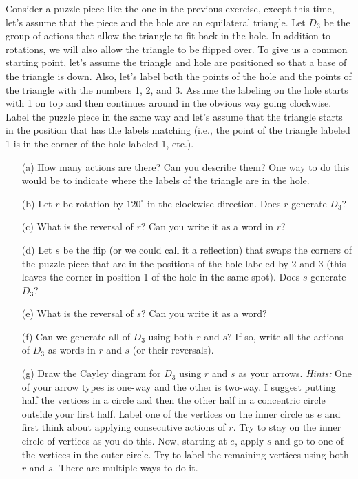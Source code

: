 \begin{exercise}\label{exer:introducing_D3}
Consider a puzzle piece like the one in the previous exercise, except this time, let's assume that the piece and the hole are an equilateral triangle.  Let $D_3$ be the group of actions that allow the triangle to fit back in the hole.  In addition to rotations, we will also allow the triangle to be flipped over.  To give us a common starting point, let's assume the triangle and hole are positioned so that a base of the triangle is down.  Also, let's label both the points of the hole and the points of the triangle with the numbers 1, 2, and 3.  Assume the labeling on the hole starts with 1 on top and then continues around in the obvious way going clockwise.  Label the puzzle piece in the same way and let's assume that the triangle starts in the position that has the labels matching (i.e., the point of the triangle labeled 1 is in the corner of the hole labeled 1, etc.).
\begin{enumerate}
\item[(a)] How many actions are there?  Can you describe them?  One way to do this would be to indicate where the labels of the triangle are in the hole.
\item[(b)] Let $r$ be rotation by $120^\circ$ in the clockwise direction.  Does $r$ generate $D_3$?
\item[(c)] What is the reversal of $r$?  Can you write it as a word in $r$?
\item[(d)] Let $s$ be the flip (or we could call it a reflection) that swaps the corners of the puzzle piece that are in the positions of the hole labeled by 2 and 3 (this leaves the corner in position 1 of the hole in the same spot).  Does $s$ generate $D_3$?
\item[(e)] What is the reversal of $s$?  Can you write it as a word?
\item[(f)] Can we generate all of $D_3$ using both $r$ and $s$?  If so, write all the actions of $D_3$ as words in $r$ and $s$ (or their reversals).
\item[(g)] Draw the Cayley diagram for $D_3$ using $r$ and $s$ as your arrows.  \emph{Hints:} One of your arrow types is one-way and the other is two-way.  I suggest putting half the vertices in a circle and then the other half in a concentric circle outside your first half.  Label one of the vertices on the inner circle as $e$ and first think about applying consecutive actions of $r$.  Try to stay on the inner circle of vertices as you do this.  Now, starting at $e$, apply $s$ and go to one of the vertices in the outer circle.  Try to label the remaining vertices using both $r$ and $s$.  There are multiple ways to do it.
\end{enumerate}
\end{exercise}

